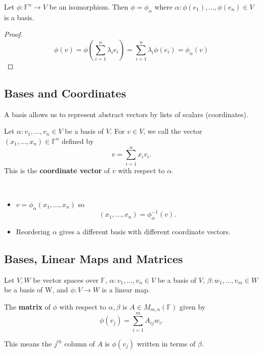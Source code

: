 \begin{prop}
    Let $\phi: \mathbb{F}^n \rightarrow V$ be an isomorphism. Then $\phi = \phi_\alpha$ where $\alpha : \phi(e_1),...,\phi(e_n) \in V$ is a basis.
\end{prop}
\begin{proof}
  \[\phi(v) = \phi \left(\sum_{i=1}^n \lambda_i e_i\right) = \sum_{i=1}^n \lambda_i \phi(e_i) = \phi_\alpha(v)\]
\end{proof}

\subsection{Bases and Coordinates}

A basis allows us to represent abstract vectors by lists of scalars (coordinates).

\begin{definition}
    Let $\alpha : v_1,...,v_n \in V$ be a basis of $V$. For $v \in V$, we call the vector $(x_1,...,x_n) \in \mathbb{F}^n$ defined by
    \[v = \sum_{i = 1}^n x_i v_i.\]
    This is the {\bf coordinate vector} of $v$ with respect to $\alpha$.
\end{definition}

\begin{remark} $ $
      
  \begin{itemize}
    \item $v = \phi_\alpha (x_1,...,x_n)$ so
      \[(x_1, ..., x_n) = \phi_\alpha^{-1}(v).\]
    \item Reordering $\alpha$ gives a different basis with different coordinate vectors.
  \end{itemize}

\end{remark}

\subsection{Bases, Linear Maps and Matrices}

\begin{definition}
    Let $V, W$ be vector spaces over $\mathbb{F}$, $\alpha : v_1,...,v_n \in V$ be a basis of $V$, $\beta: w_1,...,v_m \in W$ be a basis of W, and $\phi : V \rightarrow W$ is a linear map.

    The {\bf matrix} of $\phi$ with respect to $\alpha, \beta$ is $A \in M_{m, n}(\mathbb{F})$ given by
    \[\phi(v_j) = \sum_{i=1}^m A_{ij}w_i.\]


    This means the $j^{th}$ column of $A$ is $\phi(v_j)$ written in terms of $\beta$.
\end{definition}



